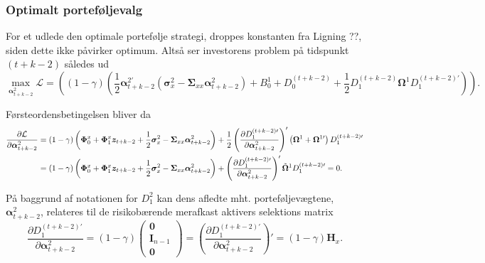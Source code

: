 \documentclass[
  a4paper,
  oneside]{memoir}
\begin{document}
\hypertarget{optimportaer}{%
\subsubsection{Optimalt porteføljevalg}\label{optimportaer}}

For et udlede den optimale portefølje strategi, droppes konstanten fra Ligning ??, siden dette ikke påvirker optimum. Altså ser investorens problem på tidspunkt \((t+k-2)\) således ud
\[\max_{\bm{\alpha}_{t+k-2}^2}\mathcal{L}= \left( \left(1-\gamma\right) \left(\frac{1}{2}\bm{\alpha}_{t+k-2}^{2\prime} \left(\bm{\sigma}_x^2 - \bm{\Sigma}_{xx}\bm{\alpha}_{t+k-2}^2\right) + B_0^1 + D_0^{\left(t+k-2\right)} + \frac{1}{2} D_1^{\left(t+k-2\right)} \bm{\Omega}^1 D_1^{\left(t+k-2\right)\prime}\right)\right).\]

Førsteordensbetingelsen bliver da
\begin{align*}
\frac{\partial \mathcal{L}}{\partial\bm{\alpha}_{t+k-2}^2 }&=\left(1-\gamma\right) \left(\bm{\Phi}_0^x+\bm{\Phi}_1^x\bm{z}_{t+k-2} + \frac{1}{2} \bm{\sigma}_x^2 -\bm{\Sigma}_{xx}\bm{\alpha}_{t+k-2}^2 \right) + \frac{1}{2} \left(\frac{\partial D_1^{\left(t+k-2\right)\prime}}{\partial \bm{\alpha}_{t+k-2}^2}\right)' \left(\bm{\Omega}^1+\bm{\Omega}^{1\prime}\right) D_1^{\left(t+k-2\right)\prime}\\
                                                           &=\left(1-\gamma\right) \left(\bm{\Phi}_0^x+\bm{\Phi}_1^x\bm{z}_{t+k-2} + \frac{1}{2} \bm{\sigma}_x^2 -\bm{\Sigma}_{xx}\bm{\alpha}_{t+k-2}^2 \right) + \left(\frac{\partial D_1^{\left(t+k-2\right)\prime}}{\partial \bm{\alpha}_{t+k-2}^2}\right)' \Tilde{\bm{\Omega}}^1 D_1^{\left(t+k-2\right)\prime} = 0.
\end{align*}

På baggrund af notationen for \(D_1^2\) kan dens afledte mht. porteføljevægtene, \(\bm{\alpha}_{t+k-2}^2\), relateres til de risikobærende merafkast aktivers selektions matrix
\[\frac{\partial D_1^{\left(t+k-2\right)\prime}}{\partial \bm{\alpha}_{t+k-2}^2} = \left(1-\gamma\right) \begin{pmatrix} \bm{0} \\ \bm{I}_{n-1} \\ \bm{0}\end{pmatrix}=\left(\frac{\partial D_1^{\left(t+k-2\right)\prime}}{\partial \bm{\alpha}_{t+k-2}^2}\right)' = \left(1-\gamma\right)\bm{H}_x.\]
\end{document}
